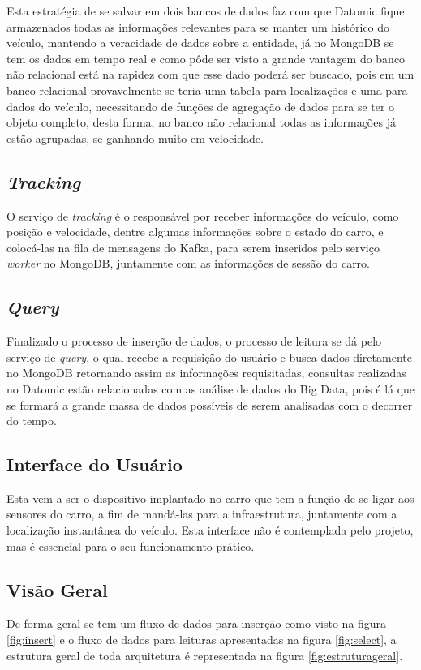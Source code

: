 Esta estratégia de se salvar em dois bancos de dados faz com que Datomic fique armazenados todas as informações relevantes para se manter um histórico do veículo, mantendo a veracidade de dados sobre a entidade, já no MongoDB se tem os dados em tempo real e como pôde ser visto a grande vantagem do banco não relacional está na rapidez com que esse dado poderá ser buscado, pois em um banco relacional provavelmente se teria uma tabela para localizações e uma para dados do veículo, necessitando de funções de agregação de dados para se ter o objeto completo, desta forma, no banco não relacional todas as informações já estão agrupadas, se ganhando muito em velocidade.

\subsection{\textit{Tracking}}
O serviço de \textit{tracking} é o responsável por receber informações do veículo, como posição e velocidade, dentre algumas informações sobre o estado do carro, e colocá-las na fila de mensagens do Kafka, para serem inseridos pelo serviço \textit{worker} no MongoDB, juntamente com as informações de sessão do carro. 

\subsection{\textit{Query}}
Finalizado o processo de inserção de dados, o processo de leitura se dá pelo serviço de \textit{query}, o qual recebe a requisição do usuário e busca dados diretamente no MongoDB retornando assim as informações requisitadas, consultas realizadas no Datomic estão relacionadas com as análise de dados do Big Data, pois é lá que se formará a grande massa de dados possíveis de serem analisadas com o decorrer do tempo.

\subsection{Interface do Usuário}
Esta vem a ser o dispositivo implantado no carro que tem a função de se ligar aos sensores do carro, a fim de mandá-las para a infraestrutura, juntamente com a localização instantânea do veículo. Esta interface não é contemplada pelo projeto, mas é essencial para o seu funcionamento prático.

\subsection{Visão Geral}
De forma geral se tem um fluxo de dados para inserção como visto na figura \ref{fig:insert} e o fluxo de dados para leituras apresentadas na figura \ref{fig:select}, a estrutura geral de toda arquitetura é representada na figura \ref{fig:estruturageral}.

